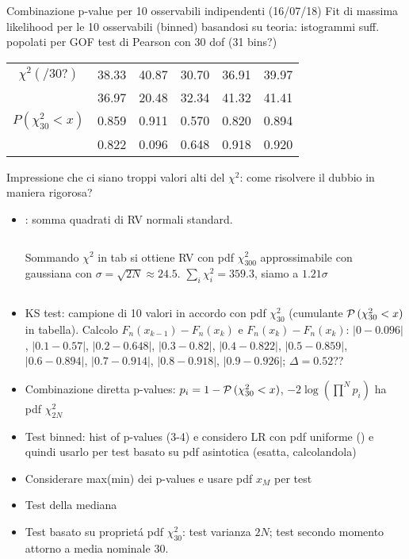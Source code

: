 \begin{wordonframe}{Combinazione p-value per 10 osservabili indipendenti (16/07/18)}
	Fit di massima likelihood per le 10 osservabili (binned) basandosi su teoria: istogrammi suff. popolati per GOF test di Pearson con 30 dof (31 bins?)
	\begin{table}[h!]
		\centering
		\begin{tabular}{||cccccc||} 
			$\chi^2(/30?)$&38.33&40.87&30.70&36.91&39.97\\
			&36.97&20.48&32.34&41.32&41.41\\
			$P(\chi^2_{30}<x)$&0.859&0.911&0.570&0.820&0.894\\
			&0.822&0.096&0.648&0.918&0.920\\
		\end{tabular}
	\end{table}
	Impressione che ci siano troppi valori alti del $\chi^2$: come risolvere il dubbio in maniera rigorosa?
	\begin{itemize}
	\item {}: somma quadrati di RV normali standard. 
	\begin{columns}[T]\begin{column}{0.5\textwidth}
			Sommando $\chi^2$ in tab si ottiene RV con pdf $\chi^2_{300}$ approssimabile con gaussiana con $\sigma=\sqrt{2N}\approx24.5$.
			$\sum_i\chi^2_i=359.3$, siamo a $1.21\sigma$
		\end{column}\begin{column}{0.5\textwidth}
	\end{column}\end{columns}
	\item KS test: campione di 10 valori in accordo con pdf $\chi^2_{30}$ (cumulante $\operatorname{\mathcal{P}}{(\chi^2_{30}<x)}$ in tabella). Calcolo $F_n(x_{k-1})-F_n(x_k)$ e $F_n(x_k)-F_n(x_k)$:  $|0-0.096|$, $|0.1-0.57|$, $|0.2-0.648|$, $|0.3-0.82|$, $|0.4-0.822|$, $|0.5-0.859|$, $|0.6-0.894|$, $|0.7-0.914|$, $|0.8-0.918|$, $|0.9-0.926|$; $\Delta=0.52$??
	\item Combinazione diretta p-values: $p_i=1-\operatorname{\mathcal{P}}{(\chi^2_{30}<x)}$,  $-2\log{(\prod^Np_i)}$ ha pdf $\chi^2_{2N}$
	\item Test binned: hist of p-values (3-4) e considero LR con pdf uniforme () e quindi usarlo per test basato su pdf asintotica (esatta, calcolandola)
	\item Considerare max(min) dei p-values e usare pdf $x_M$ per test
	\item Test della mediana
	\item Test basato su propriet\'a pdf $\chi^2_{30}$: test varianza $2N$; test secondo momento attorno a media nominale 30.
\end{itemize}
\end{wordonframe}

